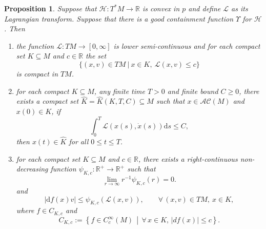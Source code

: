 \documentclass[a4paper]{article}
\newcommand{\bR}{\mathbb{R}}
\numberwithin{equation}{section}
\newtheorem{proposition}[theorem]{Proposition}
\theoremstyle{definition}
\begin{document}
\begin{proposition}\label{pro_three_conditions}
	Suppose that $\mathcal{H}: T^*M\to \mathbb{R}$ is convex in $p$ and define $\mathcal{L}$ as its Lagrangian transform. Suppose that there is a good containment function $\Upsilon$ for $\mathcal{H}$. Then
	\begin{enumerate}
		\item \label{item_compact}the function $\mathcal{L}: TM\to [0,\infty]$ is lower semi-continuous and for each compact set $K\subseteq M$ and $c\in \mathbb{R}$ the set
		\begin{equation*}
			\{(x,v)\in TM ~|~x\in K,~ \mathcal{L}(x,v)\leq c\}
		\end{equation*}
		is compact in $TM$.
		\item \label{item_LleqC}for each compact $K\subseteq M$, any finite time $T>0$ and finite bound $C\geq 0$, there exists a compact set  $\hat{K}=\hat{K}(K,T,C)\subseteq M$ such that $x\in \mathcal{AC}(M)$ and $x(0)\in K$, if
		\begin{equation*}
			\int^T_0\mathcal{L}(x(s),\dot{x}(s))\mathrm{d}s\leq C,
		\end{equation*}
		then $x(t)\in \hat{K}$ for all $0\leq t\leq T$.
        \item \label{item:control_Psi_on_L_sets}
        
        for each compact set $K \subseteq M$ and $c \in \bR$, there exists a right-continuous non-decreasing function $\psi_{K,c}:\mathbb{R}^+\to \mathbb{R}^+$ such that 
        \begin{equation}\label{eqn_Psi}
			\lim_{r\to \infty}r^{-1}\psi_{K,c}(r)=0.
		\end{equation}
        and
        \begin{equation*} \label{eqn:definition:}
			|\mathrm{d}f(x) {v}|\leq \psi_{K,c}(\mathcal{L}(x,v)), \qquad \forall \, (x,v) \in TM,~x \in K,
		\end{equation*}
        where $f \in C_{K,c}$ and
        \begin{equation}\label{eqn:def_C_Kc}
            C_{K,c} := \left\{f\in C^{\infty}_c(M) \, \middle| \, \forall \,x \in K,\,|df(x)|\leq c  \right\}.
        \end{equation}
      
	\end{enumerate}
\end{proposition}
\end{document}
